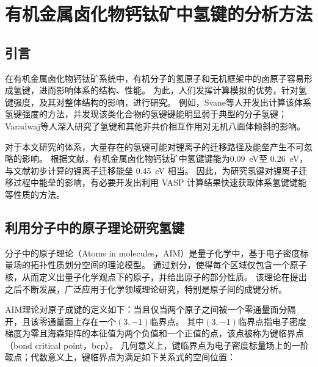 \chapter{有机金属卤化物钙钛矿中氢键的分析方法}
\label{ch:bcp}

\section{引言}

在有机金属卤化物钙钛矿系统中，有机分子的氢原子和无机框架中的卤原子容易形成氢键，进而影响体系的结构、性能。
为此，人们发挥计算模拟的优势，针对氢键强度，及其对整体结构的影响，进行研究。
例如，Svane等人开发出计算该体系氢键强度的方法，并发现该类化合物的氢键键能明显弱于典型的分子氢键；
Varadwaj等人深入研究了氢键和其他非共价相互作用对无机八面体倾斜的影响。

对于本文研究的体系，大量存在的氢键可能对锂离子的迁移路径及能垒产生不可忽略的影响。
根据文献，有机金属卤化物钙钛矿中氢键键能为\SI{0.09}{eV}至 \SI{0.26}{eV}，与文献初步计算的锂离子迁移能垒 \SI{0.45}{eV} 相当。
因此，为研究氢键对锂离子迁移过程中能垒的影响，有必要开发出利用 VASP 计算结果快速获取体系氢键键能等性质的方法。

\section{利用分子中的原子理论研究氢键}

分子中的原子理论（Atoms in molecules，AIM）是量子化学中，基于电子密度标量场的拓扑性质划分空间的理论模型。
通过划分，使得每个区域仅包含一个原子核，从而定义出量子化学观点下的原子，并给出原子的部分性质。
该理论在提出之后不断发展，广泛应用于化学领域理论研究，特别是原子间的成键分析。

AIM理论对原子成键的定义如下：当且仅当两个原子之间被一个零通量面分隔开，且该零通量面上存在一个$(3,-1)$临界点。
其中$(3,-1)$临界点指电子密度梯度为零且海森矩阵的本征值为两个负值和一个正值的点，该点被称为键临界点（bond critical point，bcp）。
几何意义上，键临界点为电子密度标量场上的一阶鞍点；代数意义上，键临界点为满足如下关系式的空间位置：

